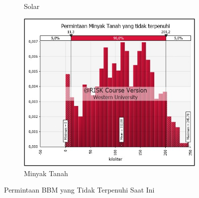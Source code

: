 \begin{figure}[!ht]
\begin{subfigure}{0.48\textwidth}
        \caption{Solar}
        \label{fig:minus-solar-saat-ini}
    \end{subfigure}
    
    \vspace{1cm}  %
    
    \begin{subfigure}{0.5\textwidth}
        \centering
        \includegraphics[width=\textwidth]{grafik/minus-mt-saat-ini.jpg}
        \caption{Minyak Tanah}
        \label{fig:minus-mt-saat-ini}
    \end{subfigure}
    \caption*{Permintaan BBM yang Tidak Terpenuhi Saat Ini}
    \label{fig:minus-bbm-saat-ini}
\end{figure}

